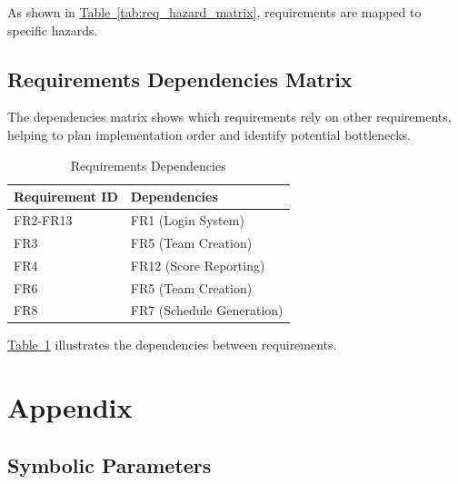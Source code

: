 \documentclass[12pt, titlepage]{article}
\begin{document}
As shown in \hyperref[tab:req_hazard_matrix]{Table~\ref{tab:req_hazard_matrix}}, requirements are mapped to specific hazards.

\subsection{Requirements Dependencies Matrix}
The dependencies matrix shows which requirements rely on other requirements, helping to plan implementation order and identify potential bottlenecks.

\begin{table}[H]
\centering
\begin{tabular}{|p{}|p{}|}
\hline
\textbf{Requirement ID} & \textbf{Dependencies} \\
\hline
FR2-FR13 & FR1 (Login System) \\
\hline
FR3 & FR5 (Team Creation) \\
\hline
FR4 & FR12 (Score Reporting) \\
\hline
FR6 & FR5 (Team Creation) \\
\hline
FR8 & FR7 (Schedule Generation) \\
\hline
\end{tabular}
\caption{Requirements Dependencies}
\label{tab:req_dependencies}
\end{table}

\hyperref[tab:req_dependencies]{Table~\ref{tab:req_dependencies}} illustrates the dependencies between requirements.

\section{Appendix}

\subsection{Symbolic Parameters}
\end{document}
